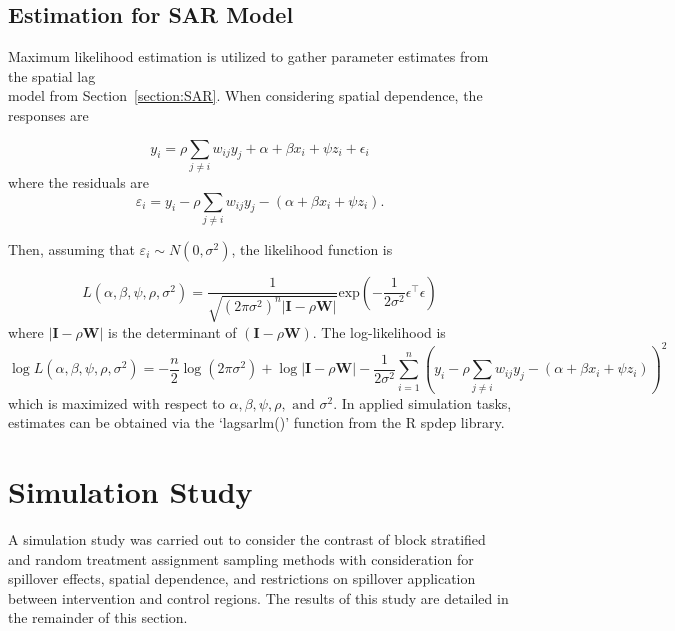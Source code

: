 \documentclass{article}[11pt]
\begin{document}
\subsection{Estimation for SAR Model}

Maximum likelihood estimation is utilized to gather parameter estimates from the spatial lag \\ model from Section~\ref{section:SAR}\cite{ord_estimation_1975}\cite{bivand_comparing_2015}\cite{bivand_computing_2013}. When considering spatial dependence, the responses are

\begin{equation}
    y_i = \rho \sum_{j\neq i}w_{ij}y_{j} + \alpha + \beta x_i + \psi z_i + \epsilon_i
\end{equation}
where the residuals are
\begin{equation}
    \varepsilon_i = y_i - \rho \sum_{j\neq i}w_{ij}y_{j} - \left(\alpha + \beta x_i + \psi z_i\right).
\end{equation}

Then, assuming that $\varepsilon_i \sim N(0,\sigma^2)$, the likelihood function is

\begin{equation}
    L\left(\alpha, \beta, \psi, \rho, \sigma^2\right) = \frac{1}{\sqrt{\left(2\pi\sigma^2\right)^n |\mathbf{I}-\rho\mathbf{W}|}}\text{exp}\left(-\frac{1}{2\sigma^2}\epsilon^{\top}\epsilon\right)
\end{equation}
where $|\mathbf{I}-\rho\mathbf{W}|$ is the determinant of $\left(\mathbf{I}-\rho\mathbf{W}\right)$. The log-likelihood is
\begin{equation}
    \log L\left(\alpha, \beta, \psi, \rho, \sigma^2\right) = -\frac{n}{2}\log\left(2\pi\sigma^2\right)+\log|\mathbf{I}-\rho\mathbf{W}|-\frac{1}{2\sigma^2}\sum_{i=1}^{n}\left(y_i - \rho \sum_{j\neq i}w_{ij}y_{j} - \left(\alpha + \beta x_i +\psi z_i\right)\right)^2 
\end{equation}
which is maximized with respect to $\alpha, \beta, \psi, \rho, \text{ and } \sigma^2$. In applied simulation tasks, estimates can be obtained via the `lagsarlm()' function from the R spdep library\cite{bivand_r_2022}.

\section{Simulation Study}

A simulation study was carried out to consider the contrast of block stratified and random treatment assignment sampling methods with consideration for spillover effects, spatial dependence, and restrictions on spillover application between intervention and control regions. The results of this study are detailed in the remainder of this section.
\end{document}
